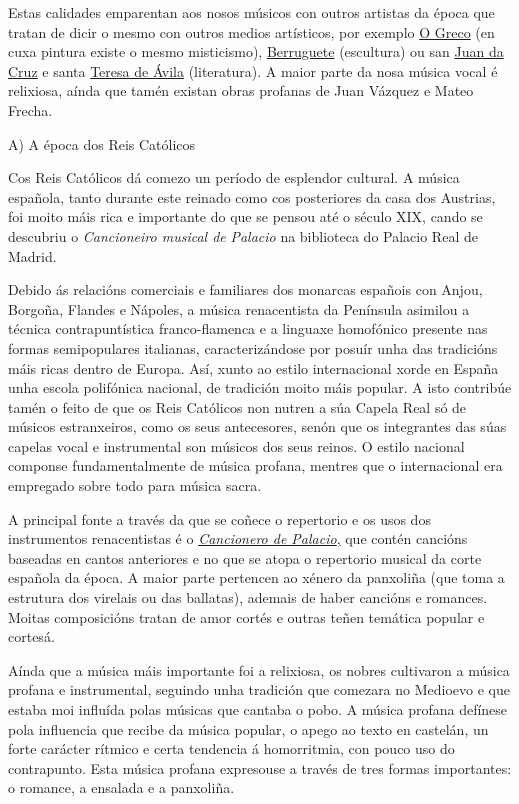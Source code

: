 \documentclass[
]{article}
\begin{document}
Estas calidades emparentan aos nosos músicos con outros artistas da
época que tratan de dicir o mesmo con outros medios artísticos, por
exemplo \href{http://es.wikipedia.org/wiki/El_Greco}{O Greco} (en cuxa
pintura existe o mesmo misticismo),
\href{http://es.wikipedia.org/wiki/Alonso_Berruguete}{Berruguete}
(escultura) ou san
\href{http://es.wikipedia.org/wiki/Juan_de_la_Cruz}{Juan da Cruz} e
santa \href{http://es.wikipedia.org/wiki/Teresa_de_\%C3\%81vila}{Teresa
de Ávila} (literatura). A maior parte da nosa música vocal é relixiosa,
aínda que tamén existan obras profanas de Juan Vázquez e Mateo Frecha.

A) A época dos Reis Católicos

Cos Reis Católicos dá comezo un período de esplendor cultural. A música
española, tanto durante este reinado como cos posteriores da casa dos
Austrias, foi moito máis rica e importante do que se pensou até o século
XIX, cando se descubriu o \emph{Cancioneiro musical de} \emph{Palacio}
na biblioteca do Palacio Real de Madrid.

Debido ás relacións comerciais e familiares dos monarcas españois con
Anjou, Borgoña, Flandes e Nápoles, a música renacentista da Península
asimilou a técnica contrapuntística franco-flamenca e a linguaxe
homofónico presente nas formas semipopulares italianas, caracterizándose
por posuír unha das tradicións máis ricas dentro de Europa. Así, xunto
ao estilo internacional xorde en España unha escola polifónica nacional,
de tradición moito máis popular. A isto contribúe tamén o feito de que
os Reis Católicos non nutren a súa Capela Real só de músicos
estranxeiros, como os seus antecesores, senón que os integrantes das
súas capelas vocal e instrumental son músicos dos seus reinos. O estilo
nacional componse fundamentalmente de música profana, mentres que o
internacional era empregado sobre todo para música sacra.

A principal fonte a través da que se coñece o repertorio e os usos dos
instrumentos renacentistas é o
\href{http://es.wikipedia.org/wiki/Cancionero_Musical_de_Palacio}{\emph{Cancionero
de Palacio},} que contén cancións baseadas en cantos anteriores e no que
se atopa o repertorio musical da corte española da época. A maior parte
pertencen ao xénero da panxoliña (que toma a estrutura dos virelais ou
das ballatas), ademais de haber cancións e romances. Moitas composicións
tratan de amor cortés e outras teñen temática popular e cortesá.

Aínda que a música máis importante foi a relixiosa, os nobres cultivaron
a música profana e instrumental, seguindo unha tradición que comezara no
Medioevo e que estaba moi influída polas músicas que cantaba o pobo. A
música profana defínese pola influencia que recibe da música popular, o
apego ao texto en castelán, un forte carácter rítmico e certa tendencia
á homorritmia, con pouco uso do contrapunto. Esta música profana
expresouse a través de tres formas importantes: o romance, a ensalada e
a panxoliña.
\end{document}
